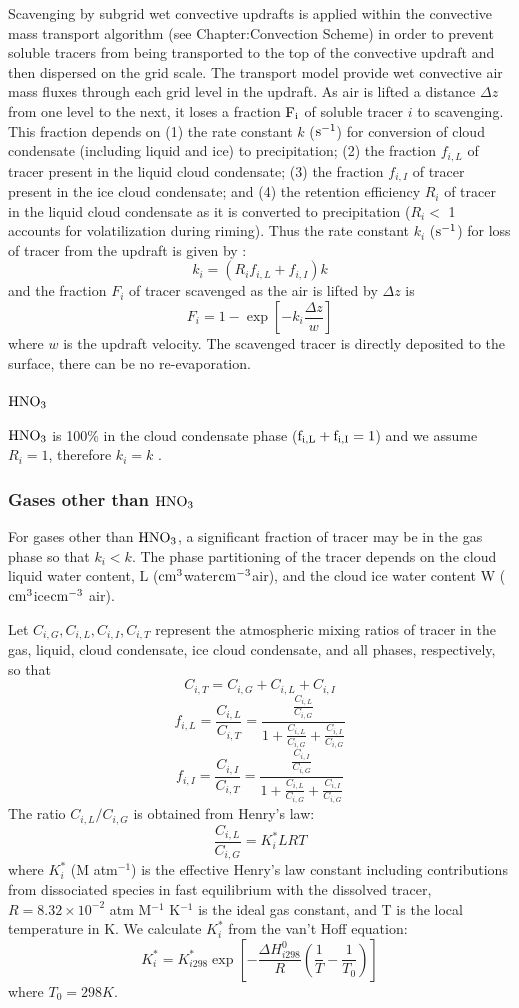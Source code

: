 Scavenging by subgrid wet convective updrafts is applied within the 
convective mass transport algorithm (see Chapter:Convection Scheme) in 
order to prevent soluble tracers from being transported to the top of the 
convective updraft and then dispersed on the grid scale. The transport model 
provide wet convective air mass fluxes through each grid level in the 
updraft. As air is lifted a distance $\Delta z$ from one level to the next, 
it loses a fraction $\rm F_i$ of soluble tracer $i$ to scavenging. This 
fraction depends on (1) the rate constant $k$ ($\rm s^{-1}$) for conversion 
of cloud condensate (including liquid and ice) to precipitation; 
(2) the fraction $f_{i,L}$ of tracer present in the liquid cloud condensate; 
(3) the fraction $f_{i,I}$ of tracer present in the ice cloud condensate; 
and (4) the retention efficiency $R_i$ of tracer in the liquid cloud condensate
as it is converted to precipitation ($R_i <$ 1 accounts for volatilization 
during riming). Thus the rate constant $k_i$ ($\rm s^{-1}$) for loss of 
tracer from the updraft is given by \citet{Mari2000}:
$$
k_i = (R_i f_{i,L} + f_{i,I}) k
$$
and the fraction $F_i$ of tracer scavenged as the air is lifted by $\Delta z$ 
is
$$
F_i = 1 - \exp\left[ -k_i \frac{\Delta z}{w} \right]
$$
where $w$ is the updraft velocity. The scavenged tracer is directly deposited 
to the surface, there can be no re-evaporation.
\subsubsection*{$\rm HNO_3$} 
$\rm HNO_3$ is 100\% in the cloud condensate phase ($\rm f_{i,L} + f_{i,I}=1$) 
and we assume $R_i = 1$, therefore $k_i = k$ \citep{Mari2000,Liu2001}.
\subsubsection*{Gases other than $\rm HNO_3$} 
For gases other than $\rm HNO_3$, a significant fraction of tracer may be in 
the gas phase so that $k_i < k$. The phase partitioning of the tracer depends 
on the cloud liquid water content, L ($\rm cm^3$water$\rm cm^{-3}$air), and the 
cloud ice water content W ($\rm cm^3$ice$\rm cm^{-3}$ air). 

Let $C_{i,G}, C_{i,L}, C_{i,I}, C_{i,T}$ represent the atmospheric mixing 
ratios of tracer in the gas, liquid, cloud condensate, ice cloud condensate, 
and all phases, respectively, so that 
$$
 C_{i,T} = C_{i,G} + C_{i,L} + C_{i,I}
$$
$$
f_{i,L} = \frac{C_{i,L}}{C_{i,T}} = \frac{\frac{C_{i,L}}{C_{i,G}}}{1 + \frac{C_{i,L}}{C_{i,G}} + \frac{C_{i,I}}{C_{i,G}}}
$$
$$
f_{i,I} = \frac{C_{i,I}}{C_{i,T}} = \frac{\frac{C_{i,I}}{C_{i,G}}}{1 + \frac{C_{i,L}}{C_{i,G}} + \frac{C_{i,I}}{C_{i,G}}}
$$
The ratio $C_{i,L}/C_{i,G}$ is obtained from Henry's law:
$$
\frac{C_{i,L}}{C_{i,G}} = K_i^* LRT
$$
where $K_i^*$ (M atm$^{-1}$) is the effective Henry's law constant including 
contributions from dissociated species in fast equilibrium with the dissolved 
tracer, $R = 8.32\times 10^{-2}$ atm M$^{-1}$ K$^{-1}$ is the ideal gas constant, and T is the local temperature in K. We calculate $K_i^*$ from the van't Hoff
equation: 
$$
K_i^* = K_{i 298}^* \exp\left[ -\frac{\Delta H^0_{i 298}}{R}\left(\frac{1}{T} - \frac{1}{T_0} \right) \right]
$$
where $T_0 = 298 K$. 

